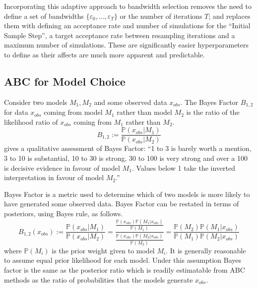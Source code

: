 \documentclass[11pt,a4paper]{article}
\newcommand*{\prob}{\mathbb{P}}
\theoremstyle{break}
\begin{document}
  \par Incorporating this adaptive approach to bandwidth selection removes the need to define a set of bandwidths $\{\varepsilon_0,\dots,\varepsilon_T\}$ or the number of iterations $T$; and replaces them with defining an acceptance rate and number of simulations for the ``Initial Sample Step'', a target acceptance rate between resampling iterations and a maximum number of simulations. These are significantly easier hyperparameters to define as their affects are much more apparent and predictable.


\subsection{ABC for Model Choice}\label{sec_abc_model_choice}

  \begin{box_definition}
    Consider two models $M_1,M_2$ and some observed data $x_{obs}$. The Bayes Factor $B_{1,2}$ for data $x_{obs}$ coming from model $M_1$ rather than model $M_2$ is the ratio of the likelihood ratio of $x_{obs}$ coming from $M_1$ rather than $M_2$.
    \[ B_{1,2}:=\frac{\prob(x_{obs}|M_1)}{\prob(x_{obs}|M_2)} \]
    \cite[]{theory_of_probability} gives a qualitative assessment of Bayes Factor: ``1 to 3 is barely worth a mention, 3 to 10 is substantial, 10 to 30 is strong, 30 to 100 is very strong and over a 100 is decisive evidence in favour of model $M_1$. Values below 1 take the inverted interpretation in favour of model $M_2$.''
    \par
  \end{box_definition}

  Bayes Factor is a metric used to determine which of two models is more likely to have generated some observed data. Bayes Factor can be restated in terms of posteriors, using Bayes rule, as follows.
  \[ B_{1,2}(x_{obs}):=\frac{\prob(x_{obs}|M_1)}{\prob(x_{obs}|M_2)}=\frac{\frac{\prob(x_{obs})\prob(M_1|x_{obs})}{\prob(M_1)}}{\frac{\prob(x_{obs})\prob(M_2|x_{obs})}{\prob(M_2)}}=\frac{\prob(M_2)\prob(M_1|x_{obs})}{\prob(M_1)\prob(M_2|x_{obs})} \]
  where $\prob(M_i)$ is the prior weight given to model $M_i$. It is generally reasonable to assume equal prior likelihood for each model. Under this assumption Bayes factor is the same as the posterior ratio which is readily estimatable from ABC methods as the ratio of probabilities that the models generate $x_{obs}$.
\end{document}
